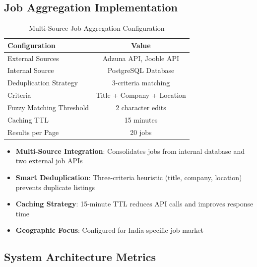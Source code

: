 \documentclass[conference]{IEEEtran}
\begin{document}
\subsection{Job Aggregation Implementation}

\begin{table}[htbp]
\caption{Multi-Source Job Aggregation Configuration}
\label{tab:aggregation}
\begin{center}
\begin{tabular}{|l|c|}
\hline
\textbf{Configuration} & \textbf{Value} \\
\hline
External Sources & Adzuna API, Jooble API \\
Internal Source & PostgreSQL Database \\
Deduplication Strategy & 3-criteria matching \\
Criteria & Title + Company + Location \\
Fuzzy Matching Threshold & 2 character edits \\
Caching TTL & 15 minutes \\
Results per Page & 20 jobs \\
\hline
\end{tabular}
\end{center}
\end{table}

\begin{itemize}
    \item \textbf{Multi-Source Integration}: Consolidates jobs from internal database and two external job APIs
    \item \textbf{Smart Deduplication}: Three-criteria heuristic (title, company, location) prevents duplicate listings
    \item \textbf{Caching Strategy}: 15-minute TTL reduces API calls and improves response time
    \item \textbf{Geographic Focus}: Configured for India-specific job market
\end{itemize}

\subsection{System Architecture Metrics}
\end{document}

